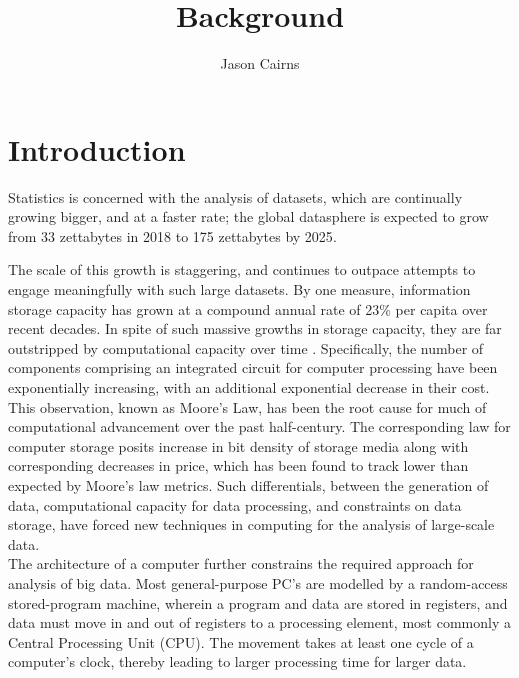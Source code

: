 \documentclass[a4paper,10pt]{article}
\begin{document}
\title{Background}
\author{Jason Cairns}
  
\maketitle

\section{Introduction}
Statistics is concerned with the analysis of datasets, which are continually growing bigger, and at a faster rate; the global datasphere is expected to grow from 33 zettabytes in 2018 to 175 zettabytes by 2025\cite{rydning2018digitization}.

The scale of this growth is staggering, and continues to outpace attempts to engage meaningfully with such large datasets. By one measure, information storage capacity has grown at a compound annual rate of 23\% per capita over recent decades\cite{hilbert2011world}.
In spite of such massive growths in storage capacity, they are far outstripped by computational capacity over time \cite{fontana2018moore}.
Specifically, the number of components comprising an integrated circuit for computer processing have been exponentially increasing, with an additional exponential decrease in their cost\cite{moore1975progress}.
This observation, known as Moore's Law, has been the root cause for much of computational advancement over the past half-century.
The corresponding law for computer storage posits increase in bit density of storage media along with corresponding decreases in price, which has been found to track lower than expected by Moore's law metrics.
Such differentials, between the generation of data, computational capacity for data processing, and constraints on data storage, have forced new techniques in computing for the analysis of large-scale data.\\

The architecture of a computer further constrains the required approach for analysis of big data.
Most general-purpose PC's are modelled by a random-access stored-program machine, wherein a program and data are stored in registers, and data must move in and out of registers to a processing element, most commonly a Central Processing Unit (CPU). 
The movement takes at least one cycle of a computer's clock, thereby leading to larger processing time for larger data.\\
\end{document}
